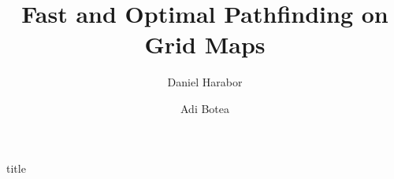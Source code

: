 \documentclass[a0,landscape]{a0poster}
\title{Fast and Optimal Pathfinding on Grid Maps}
\date{}%
\author{Daniel Harabor \and Adi Botea}
\begin{document}
\begin{staticcontents*}{title}
\maketitle
\end{staticcontents*}
\thispagestyle{empty} 


%
\end{document}

